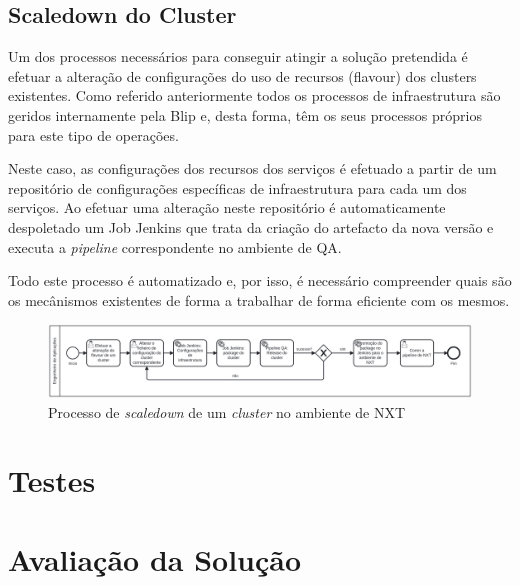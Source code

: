 \subsection{Scaledown do Cluster}

Um dos processos necessários para conseguir atingir a solução pretendida é efetuar a alteração
de configurações do uso de recursos (\gls{flavour}) dos \glspl{cluster} existentes. Como
referido anteriormente todos os processos de infraestrutura são geridos internamente pela Blip e,
desta forma, têm os seus processos próprios para este tipo de operações.

Neste caso, as configurações dos recursos dos serviços é efetuado a partir de um repositório 
de configurações específicas de infraestrutura para cada um dos serviços. Ao efetuar uma alteração
neste repositório é automaticamente despoletado um Job Jenkins que trata da criação do artefacto
da nova versão e executa a \textit{pipeline} correspondente no ambiente de \ac{QA}.

Todo este processo é automatizado e, por isso, é necessário compreender quais são os mecânismos
existentes de forma a trabalhar de forma eficiente com os mesmos. 

\begin{figure}[H]
  \centerline{\includegraphics[scale=0.12]{media/content/impl/scaledown_nxt.png}}
  \caption{Processo de \textit{scaledown} de um \textit{cluster} no ambiente de NXT}
  \label{scaledown-nxt}
\end{figure}



\section{Testes}


\section{Avaliação da Solução}


